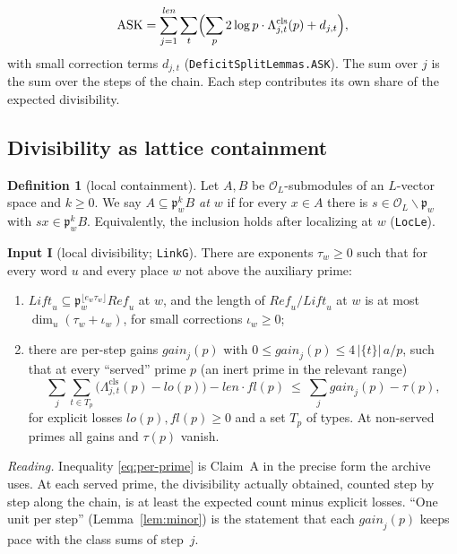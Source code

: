 \documentclass[11pt]{amsart}
\theoremstyle{definition}
\newtheorem{definition}[theorem]{Definition}
\theoremstyle{remark}
\newcommand{\len}{\mathit{len}}
\newcommand{\ASK}{\mathrm{ASK}}
\begin{document}
\begin{equation}\label{eq:ask-archive}
\ASK=\sum_{j=1}^{\len}\sum_t\Bigl(\sum_p 2\log p\cdot\Lambda^{\mathrm{cls}}_{j,t}(p)+d_{j,t}\Bigr),
\end{equation}
with small correction terms $d_{j,t}$ (\texttt{DeficitSplitLemmas.ASK}). The sum over $j$ is the sum over the steps of the chain. Each step contributes its own share of the expected divisibility.

\subsection{Divisibility as lattice containment}
\begin{definition}[local containment]
Let $A,B$ be $\mathcal O_L$-submodules of an $L$-vector space and $k\ge0$. We say \emph{$A\subseteq\mathfrak p_w^{k}B$ at $w$} if for every $x\in A$ there is $s\in\mathcal O_L\smallsetminus\mathfrak p_w$ with $sx\in\mathfrak p_w^{k}B$. Equivalently, the inclusion holds after localizing at $w$ (\texttt{LocLe}).
\end{definition}

\noindent\textbf{Input I} (local divisibility; \texttt{LinkG}). There are exponents $\tau_w\ge0$ such that for every word $u$ and every place $w$ not above the auxiliary prime:
\begin{enumerate}[label=(\roman*)]
\item $\mathit{Lift}_u\subseteq\mathfrak p_w^{\lfloor e_w\tau_w\rfloor}\mathit{Ref}_u$ at $w$, and the length of $\mathit{Ref}_u/\mathit{Lift}_u$ at $w$ is at most $\dim_u(\tau_w+\iota_w)$, for small corrections $\iota_w\ge0$;
\item there are per-step gains $\mathit{gain}_j(p)$ with $0\le\mathit{gain}_j(p)\le4\,|\{t\}|\,a/p$, such that at every ``served'' prime $p$ (an inert prime in the relevant range)
\begin{equation}\label{eq:per-prime}
\sum_{j}\sum_{t\in T_p}\bigl(\Lambda^{\mathrm{cls}}_{j,t}(p)-\mathit{lo}(p)\bigr)-\len\cdot\mathit{fl}(p)\ \le\ \sum_j\mathit{gain}_j(p)-\tau(p),
\end{equation}
for explicit losses $\mathit{lo}(p),\mathit{fl}(p)\ge0$ and a set $T_p$ of types. At non-served primes all gains and $\tau(p)$ vanish.
\end{enumerate}

\noindent\emph{Reading.} Inequality \eqref{eq:per-prime} is Claim~A in the precise form the archive uses. At each served prime, the divisibility actually obtained, counted step by step along the chain, is at least the expected count minus explicit losses. ``One unit per step'' (Lemma~\ref{lem:minor}) is the statement that each $\mathit{gain}_j(p)$ keeps pace with the class sums of step~$j$.
\end{document}
